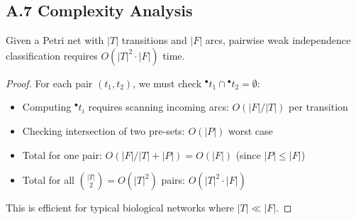\subsection*{A.7 Complexity Analysis}

\begin{proposition}
Given a Petri net with $|T|$ transitions and $|F|$ arcs, pairwise weak independence classification requires $O(|T|^2 \cdot |F|)$ time.
\end{proposition}

\begin{proof}
For each pair $(t_1, t_2)$, we must check ${}^\bullet t_1 \cap {}^\bullet t_2 = \emptyset$:
\begin{itemize}
\item Computing ${}^\bullet t_i$ requires scanning incoming arcs: $O(|F|/|T|)$ per transition
\item Checking intersection of two pre-sets: $O(|P|)$ worst case
\item Total for one pair: $O(|F|/|T| + |P|) = O(|F|)$ (since $|P| \leq |F|$)
\item Total for all $\binom{|T|}{2} = O(|T|^2)$ pairs: $O(|T|^2 \cdot |F|)$
\end{itemize}

This is efficient for typical biological networks where $|T| \ll |F|$.
\end{proof}
